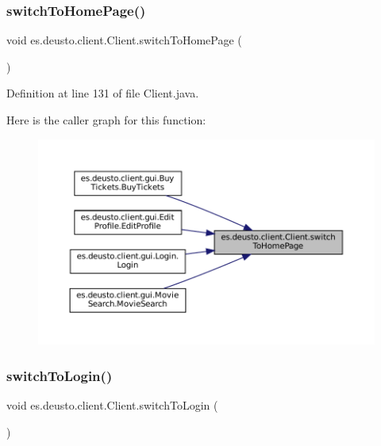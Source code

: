\subsubsection{\texorpdfstring{switchToHomePage()}{switchToHomePage()}}
{\footnotesize\ttfamily void es.\+deusto.\+client.\+Client.\+switch\+To\+Home\+Page (\begin{DoxyParamCaption}{ }\end{DoxyParamCaption})}



Definition at line 131 of file Client.\+java.

Here is the caller graph for this function\+:
\nopagebreak
\begin{figure}[H]
\begin{center}
\leavevmode
\includegraphics[width=350pt]{classes_1_1deusto_1_1client_1_1_client_aff17deef622ce410b473d4dadad36343_icgraph}
\end{center}
\end{figure}
\mbox{\label{classes_1_1deusto_1_1client_1_1_client_a66fff847d9f168900f6992fd4eff5e3d}} 
\subsubsection{\texorpdfstring{switchToLogin()}{switchToLogin()}}
{\footnotesize\ttfamily void es.\+deusto.\+client.\+Client.\+switch\+To\+Login (\begin{DoxyParamCaption}{ }\end{DoxyParamCaption})}



